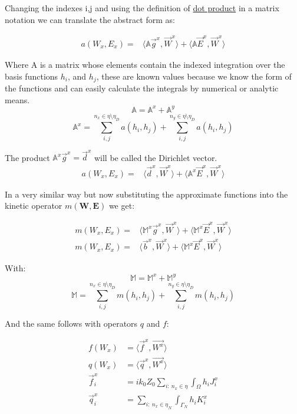 Changing the indexes i,j and using the definition of \href{http://en.wikipedia.org/wiki/Dot_product}{dot product} in a matrix notation we can translate the abstract form as:

\begin{align*}
a\left(W_x,E_x\right)=&\langle \mathbb{A}\vec{g}^x,\vec{W}^x\rangle
+\langle\mathbb{A}\vec{E}^x,\vec{W}^x\rangle  
\end{align*}

Where A is a matrix whose elements contain the indexed integration over the basis functions $h_i$, and $h_j$, these are known values because we know the form of the functions and can easily calculate the integrals by numerical or analytic means.
$$\mathbb{A} = \mathbb{A}^x+\mathbb{A}^y$$
$$\mathbb{A}^x = \sum_{i,j}^{n_x \in \eta\setminus\eta_D} a(h_i,h_j)+\sum_{i,j}^{n_y \in \eta\setminus\eta_D} a(h_i,h_j)$$

The product $\mathbb{A}^x\vec{g}^x = \vec{d}^x$ will be called the Dirichlet vector.
\begin{align}
a\left(W_x,E_x\right)=&\langle \vec{d}^x,\vec{W}^x\rangle
+\langle\mathbb{A}^x\vec{E}^x,\vec{W}^x\rangle \label{eq:potential_discrete} 
\end{align}

In a very similar way but now substituting the approximate functions into the kinetic operator $m(\mathbf{W},\mathbf{E})$ we get:

\begin{align}
m\left(W_x,E_x\right)=&\langle \mathbb{M}^x\vec{g}^x,\vec{W}^x\rangle
+\langle\mathbb{M}^x\vec{E}^x,\vec{W}^x\rangle\nonumber \\
m\left(W_x,E_x\right)=&\langle \vec{b}^x,\vec{W}^x\rangle
+\langle\mathbb{M}^x\vec{E}^x,\vec{W}^x\rangle \label{eq:kinetic_discrete}
\end{align}

With: $$\mathbb{M}=\mathbb{M}^x+\mathbb{M}^y$$$$\mathbb{M} = \sum_{i,j}^{n_x \in \eta\setminus\eta_D} m(h_i,h_j)+\sum_{i,j}^{n_y \in \eta\setminus\eta_D} m(h_i,h_j)$$

And the same follows with operators $q$ and $f$:

\begin{align}
f(W_x) &= \langle \vec{f}^x, \vec{W^x}\rangle \label{eq:body_source}\\
q(W_x) &= \langle \vec{q}^x, \vec{W^x}\rangle \label{eq:newman}\\
\vec{f}_i^x &= ik_0Z_0\sum_{i:\ n_x \in \eta}\int_{\Omega} h_iJ_i^x\nonumber\\
\vec{q}_i^x&= \sum_{i:\ n_x \in \eta_N}\int_{\Gamma_N} h_iK_i^x \nonumber
\end{align}


